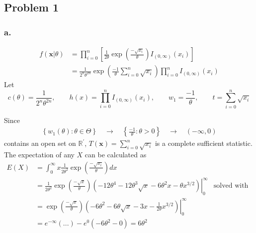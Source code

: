 \documentclass{article}
\begin{document}
\setlength{\headheight}{4\baselineskip}



\subsection*{Problem 1}
\subsubsection*{a.}
\begin{align*}
f(\mathbf{x}|\theta)&=\prod_{i=0}^n\left[\frac{1}{2\theta}\exp{\left(\frac{-\sqrt{x_i}}{\theta}\right)}I_{(0,\infty)}(x_i)\right] \\
&=\frac{1}{2^n\theta^{2n}}\exp{\left(\frac{-1}{\theta}\sum_{i=0}^n\sqrt{x_i}\right)}\prod_{i=0}^nI_{(0,\infty)}(x_i)
\end{align*}
Let 
\[
c(\theta)=\frac{1}{2^n\theta^{2n}}, \qquad h(x)=\prod_{i=0}^n I_{(0,\infty)}(x_i), \qquad w_1=\frac{-1}{\theta}, \qquad t = \sum_{i=0}^n\sqrt{x_i}
\]
\iffalse
Due to factorization (Theorem 6.2.6), $T(\mathbf{x}) = \sum_{i=0}^n\sqrt{x_i}$ is a sufficient statistic for $\theta$. 
\fi
Since
\begin{align*}
\left\{w_1(\theta):\theta \in \Theta\right\}\quad \rightarrow\quad \left\{\frac{-1}{\theta}:\theta > 0\right\}\quad \rightarrow\quad \left(-\infty, 0\right)
\end{align*} 
contains an open set on $\mathbb{R}^\prime$, $T(\mathbf{x}) = \sum_{i=0}^n\sqrt{x_i}$ is a complete sufficient statistic. The expectation of any $X$ can be calculated as 
\begin{align*}
E(X) &= \int_0^\infty x\frac{1}{2\theta^2}\exp{\left(\frac{-\sqrt{x_i}}{\theta}\right)} dx \\
&=\left.\frac{1}{2\theta^2}\exp{\left(\frac{-\sqrt{x}}{\theta}\right)}\left(-12\theta^4-12\theta^3\sqrt{x}-6\theta^2x-\theta x^{3/2}\right)\right|_0^\infty &\text{solved with Wolfram Alpha} \\
&=\left.\exp{\left(\frac{-\sqrt{x}}{\theta}\right)}\left(-6\theta^2-6\theta\sqrt{x}-3x-\frac{1}{2\theta}x^{3/2}\right)\right|_0^\infty \\
&= e^{-\infty}(...)-e^0\left(-6\theta^2-0\right) = 6\theta^2
\end{align*}
\end{document}
